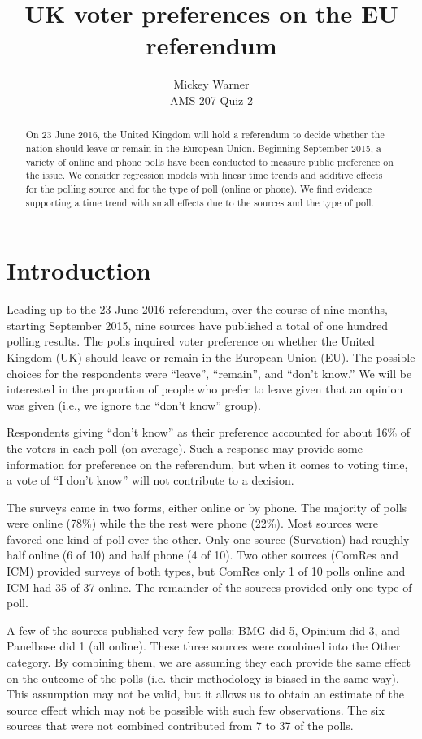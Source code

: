 \documentclass{asaproc}
\title{UK voter preferences on the EU referendum}
\author{Mickey Warner \\ AMS 207 Quiz 2}
\begin{document}
\maketitle


\begin{abstract}
On 23 June 2016, the United Kingdom will hold a referendum to decide whether the nation should leave or remain in the European Union. Beginning September 2015, a variety of online and phone polls have been conducted to measure public preference on the issue. We consider regression models with linear time trends and additive effects for the polling source and for the type of poll (online or phone). We find evidence supporting a time trend with small effects due to the sources and the type of poll.
\end{abstract}

\section{Introduction}

Leading up to the 23 June 2016 referendum, over the course of nine months, starting September 2015, nine sources have published a total of one hundred polling results. The polls inquired voter preference on whether the United Kingdom (UK) should leave or remain in the European Union (EU). The possible choices for the respondents were ``leave'', ``remain'', and ``don't know.'' We will be interested in the proportion of people who prefer to leave given that an opinion was given (i.e., we ignore the ``don't know'' group).

Respondents giving ``don't know'' as their preference accounted for about 16\% of the voters in each poll (on average). Such a response may provide some information for preference on the referendum, but when it comes to voting time, a vote of ``I don't know'' will not contribute to a decision.

The surveys came in two forms, either online or by phone. The majority of polls were online (78\%) while the the rest were phone (22\%). Most sources were favored one kind of poll over the other. Only one source (Survation) had roughly half online (6 of 10) and half phone (4 of 10). Two other sources (ComRes and ICM) provided surveys of both types, but ComRes only 1 of 10 polls online and ICM had 35 of 37 online. The remainder of the sources provided only one type of poll.

A few of the sources published very few polls: BMG did 5, Opinium did 3, and Panelbase did 1 (all online). These three sources were combined into the Other category. By combining them, we are assuming they each provide the same effect on the outcome of the polls (i.e. their methodology is biased in the same way). This assumption may not be valid, but it allows us to obtain an estimate of the source effect which may not be possible with such few observations. The six sources that were not combined contributed from 7 to 37 of the polls.
\end{document}
